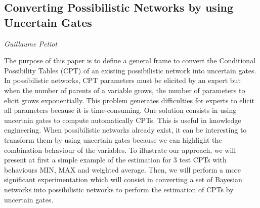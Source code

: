 \documentclass[../booklet.tex]{subfiles}
\begin{document}
\subsection[Converting Possibilistic Networks by using Uncertain Gates. {\it Guillaume Petiot}]{Converting Possibilistic Networks by using Uncertain Gates}

\begin{center}
  {\it Guillaume Petiot}
\end{center}



The purpose of this paper is to define a general frame to convert the Conditional Possibility Tables (CPT) of an existing possibilistic network into uncertain gates. In possibilistic networks, CPT parameters must be elicited by an expert but when the number of parents of a variable grows, the number of parameters to elicit grows exponentially.	This problem generates difficulties for experts to elicit all parameters because it is time-consuming. One solution consists in using uncertain gates to compute automatically CPTs. This is useful in knowledge engineering. When possibilistic networks already exist, it can be interesting to transform them by using uncertain gates because we can highlight the  combination behaviour of the variables. To illustrate our approach, we will present at first a simple example of the estimation for 3 test CPTs with behaviours MIN, MAX and weighted average. Then, we will perform a more significant experimentation which will consist in converting a set of Bayesian networks into possibilistic networks to perform the estimation of CPTs by uncertain gates. 

\end{document}
